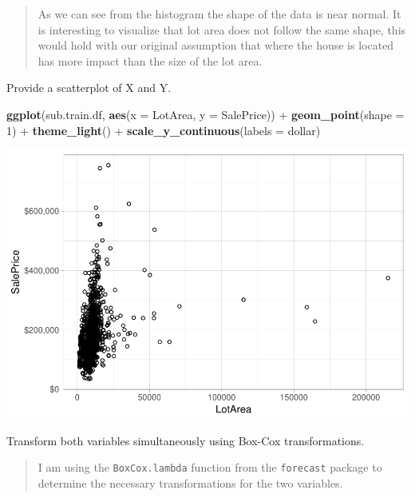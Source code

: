 \documentclass[]{article}
\newenvironment{Shaded}{\begin{snugshade}}{\end{snugshade}}
\newcommand{\KeywordTok}[1]{\textcolor[rgb]{0.13,0.29,0.53}{\textbf{{#1}}}}
\newcommand{\DataTypeTok}[1]{\textcolor[rgb]{0.13,0.29,0.53}{{#1}}}
\newcommand{\DecValTok}[1]{\textcolor[rgb]{0.00,0.00,0.81}{{#1}}}
\newcommand{\StringTok}[1]{\textcolor[rgb]{0.31,0.60,0.02}{{#1}}}
\newcommand{\NormalTok}[1]{{#1}}
\begin{document}
\begin{quote}
As we can see from the histogram the shape of the data is near normal.
It is interesting to visualize that lot area does not follow the same
shape, this would hold with our original assumption that where the house
is located has more impact than the size of the lot area.
\end{quote}

Provide a scatterplot of X and Y.

\begin{Shaded}
\begin{Highlighting}[]
\KeywordTok{ggplot}\NormalTok{(sub.train.df, }\KeywordTok{aes}\NormalTok{(}\DataTypeTok{x =} \NormalTok{LotArea, }\DataTypeTok{y =} \NormalTok{SalePrice)) +}\StringTok{ }\KeywordTok{geom_point}\NormalTok{(}\DataTypeTok{shape =} \DecValTok{1}\NormalTok{) +}\StringTok{ }
\StringTok{    }\KeywordTok{theme_light}\NormalTok{() +}\StringTok{ }\KeywordTok{scale_y_continuous}\NormalTok{(}\DataTypeTok{labels =} \NormalTok{dollar)}
\end{Highlighting}
\end{Shaded}

\includegraphics{Final_Project_files/figure-latex/scatter plot-1.pdf}

Transform both variables simultaneously using Box-Cox transformations.

\begin{quote}
I am using the \texttt{BoxCox.lambda} function from the
\texttt{forecast} package to determine the necessary transformations for
the two variables.
\end{quote}
\end{document}
